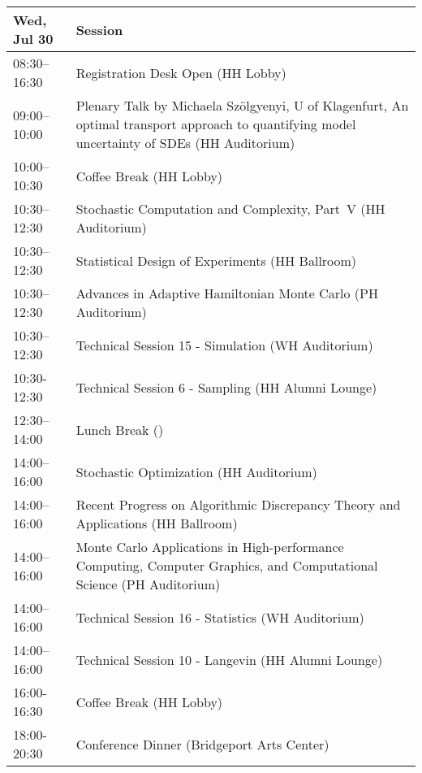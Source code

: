 \begin{table}
{\footnotesize
\begin{tabularx}{\textwidth}{>{\hsize=0.32\hsize}X|>{\hsize=1.7\hsize}X}
\hline
\textbf{Wed, Jul 30} & \textbf{Session} \\
\hline
\cellcolor{\EmptyColor}08:30–16:30 & \cellcolor{\EmptyColor}Registration Desk Open (HH Lobby) \\
\cellcolor{\PlenaryColor}09:00–10:00 & \cellcolor{\PlenaryColor}Plenary Talk by Michaela Szölgyenyi, U of Klagenfurt, An optimal transport approach to quantifying model uncertainty of SDEs (HH Auditorium) \\
\cellcolor{\EmptyColor}10:00–10:30 & \cellcolor{\EmptyColor}Coffee Break (HH Lobby) \\
\cellcolor{\SessionTitleColor}10:30–12:30 & \cellcolor{\SessionTitleColor}Stochastic Computation and Complexity, Part~V (HH Auditorium) \\
\cellcolor{\SessionTitleColor}10:30–12:30 & \cellcolor{\SessionTitleColor}Statistical Design of Experiments (HH Ballroom) \\
\cellcolor{\SessionTitleColor}10:30–12:30 & \cellcolor{\SessionTitleColor}Advances in Adaptive Hamiltonian Monte Carlo (PH Auditorium) \\
\cellcolor{\SessionLightColor}10:30–12:30 & \cellcolor{\SessionLightColor}Technical Session 15 - Simulation (WH Auditorium) \\
\cellcolor{\SessionLightColor}10:30-12:30 & \cellcolor{\SessionLightColor}Technical Session 6 - Sampling (HH Alumni Lounge) \\
\cellcolor{\EmptyColor}12:30–14:00 & \cellcolor{\EmptyColor}Lunch Break () \\
\cellcolor{\SessionTitleColor}14:00–16:00 & \cellcolor{\SessionTitleColor}Stochastic Optimization (HH Auditorium) \\
\cellcolor{\SessionTitleColor}14:00–16:00 & \cellcolor{\SessionTitleColor}Recent Progress on Algorithmic Discrepancy Theory and Applications (HH Ballroom) \\
\cellcolor{\SessionTitleColor}14:00–16:00 & \cellcolor{\SessionTitleColor}Monte Carlo Applications in High-performance Computing, Computer Graphics, and Computational Science (PH Auditorium) \\
\cellcolor{\SessionLightColor}14:00–16:00 & \cellcolor{\SessionLightColor}Technical Session 16 - Statistics (WH Auditorium) \\
\cellcolor{\SessionLightColor}14:00–16:00 & \cellcolor{\SessionLightColor}Technical Session 10 - Langevin (HH Alumni Lounge) \\
\cellcolor{\EmptyColor}16:00-16:30 & \cellcolor{\EmptyColor}Coffee Break (HH Lobby) \\
\cellcolor{\EmptyColor}18:00-20:30 & \cellcolor{\EmptyColor}Conference Dinner (Bridgeport Arts Center) \\
\hline
\end{tabularx}
}
\end{table}

